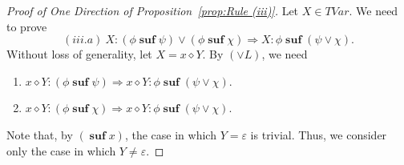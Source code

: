 \documentclass[manuscript,screen]{acmart}
\newcommand{\cat}[0]{\diamond}
\DeclareMathOperator{\osuf}{\mathbf{suf}}
\newcommand{\TVar}[0]{\textit{TVar}}
\begin{document}
\begin{proof}[Proof of One Direction of Proposition~\ref{prop:Rule (iii)}]
Let $X\in \TVar$. We need to prove 
$$
(iii.a)\ X : (\phi\osuf \psi)\vee (\phi\osuf \chi)\Rightarrow X : \phi\osuf (\psi\vee \chi). 
$$
Without loss of generality, let $X = x\cat Y$. By $(\vee L)$, we need
\begin{enumerate}
\item[$(iii.a1)$] $x\cat Y : (\phi\osuf \psi)\Rightarrow x\cat Y : \phi\osuf (\psi\vee \chi)$.
\item[$(iii.a2)$]  $x\cat Y  : (\phi\osuf \chi)\Rightarrow x\cat Y : \phi\osuf (\psi\vee \chi)$. 
\end{enumerate}
Note that, by $(\osuf x)$, the case in which $Y=\varepsilon$ is trivial. Thus, we consider only the case in which $Y\neq \varepsilon$. 


\end{proof}
\end{document}
